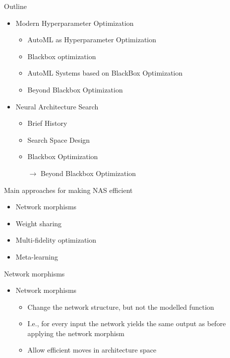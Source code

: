 \begin{frame}[c]{Outline}
\begin{itemize}
	\item Modern Hyperparameter Optimization
	\begin{itemize}
		\item AutoML as Hyperparameter Optimization
		\item Blackbox optimization
		\item AutoML Systems based on BlackBox Optimization
		\item Beyond Blackbox Optimization 
	\end{itemize}
	\item Neural Architecture Search
	\begin{itemize}
		\item Brief History
		\item Search Space Design
		\item Blackbox Optimization
		\item[$\to$] Beyond Blackbox Optimization
	\end{itemize}
\end{itemize}
\end{frame}
\begin{frame}[c]{Main approaches for making NAS efficient}
\begin{itemize}
	\item Network morphisms 
	\item Weight sharing 
	\item Multi-fidelity optimization 
	\item Meta-learning 
\end{itemize}
\end{frame}
\begin{frame}[c]{Network morphisms}
\begin{itemize}
	\item Network morphisms 
	\begin{itemize}
		\item Change the network structure,
		but not the modelled function
		\item I.e., for every input the network yields the same output as
		before applying the network morphism
		\item Allow efficient moves in architecture space
	\end{itemize}
\end{itemize}
\end{frame}
